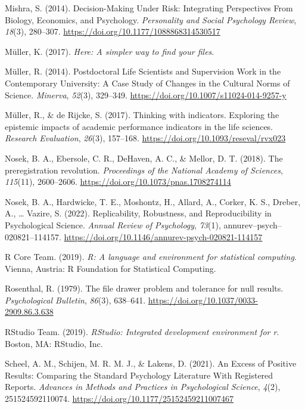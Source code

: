 \documentclass[british,,man,mask,floatsintext]{apa6}
\begin{document}
\leavevmode\hypertarget{ref-Mishra2014}{}%
Mishra, S. (2014). Decision-Making Under Risk: Integrating Perspectives From Biology, Economics, and Psychology. \emph{Personality and Social Psychology Review}, \emph{18}(3), 280--307. \url{https://doi.org/10.1177/1088868314530517}

\leavevmode\hypertarget{ref-R-here}{}%
Müller, K. (2017). \emph{Here: A simpler way to find your files}.

\leavevmode\hypertarget{ref-Muller2014}{}%
Müller, R. (2014). Postdoctoral Life Scientists and Supervision Work in the Contemporary University: A Case Study of Changes in the Cultural Norms of Science. \emph{Minerva}, \emph{52}(3), 329--349. \url{https://doi.org/10.1007/s11024-014-9257-y}

\leavevmode\hypertarget{ref-Muller2017}{}%
Müller, R., \& de Rijcke, S. (2017). Thinking with indicators. Exploring the epistemic impacts of academic performance indicators in the life sciences. \emph{Research Evaluation}, \emph{26}(3), 157--168. \url{https://doi.org/10.1093/reseval/rvx023}

\leavevmode\hypertarget{ref-Nosek2018}{}%
Nosek, B. A., Ebersole, C. R., DeHaven, A. C., \& Mellor, D. T. (2018). The preregistration revolution. \emph{Proceedings of the National Academy of Sciences}, \emph{115}(11), 2600--2606. \url{https://doi.org/10.1073/pnas.1708274114}

\leavevmode\hypertarget{ref-Nosek2022}{}%
Nosek, B. A., Hardwicke, T. E., Moshontz, H., Allard, A., Corker, K. S., Dreber, A., \ldots{} Vazire, S. (2022). Replicability, Robustness, and Reproducibility in Psychological Science. \emph{Annual Review of Psychology}, \emph{73}(1), annurev--psych--020821--114157. \url{https://doi.org/10.1146/annurev-psych-020821-114157}

\leavevmode\hypertarget{ref-R-base}{}%
R Core Team. (2019). \emph{R: A language and environment for statistical computing}. Vienna, Austria: R Foundation for Statistical Computing.

\leavevmode\hypertarget{ref-Rosenthal1979}{}%
Rosenthal, R. (1979). The file drawer problem and tolerance for null results. \emph{Psychological Bulletin}, \emph{86}(3), 638--641. \url{https://doi.org/10.1037/0033-2909.86.3.638}

\leavevmode\hypertarget{ref-RStudioTeam2019}{}%
RStudio Team. (2019). \emph{RStudio: Integrated development environment for r}. Boston, MA: RStudio, Inc.

\leavevmode\hypertarget{ref-Scheel2021}{}%
Scheel, A. M., Schijen, M. R. M. J., \& Lakens, D. (2021). An Excess of Positive Results: Comparing the Standard Psychology Literature With Registered Reports. \emph{Advances in Methods and Practices in Psychological Science}, \emph{4}(2), 251524592110074. \url{https://doi.org/10.1177/25152459211007467}
\end{document}
